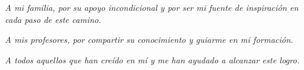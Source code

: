 \begin{center}
\vspace*{2cm}
\Large
\textit{A mi familia, por su apoyo incondicional y por ser mi fuente de inspiración en cada paso de este camino.}

\vspace{1cm}
\textit{A mis profesores, por compartir su conocimiento y guiarme en mi formación.}

\vspace{1cm}
\textit{A todos aquellos que han creído en mí y me han ayudado a alcanzar este logro.}
\end{center} 